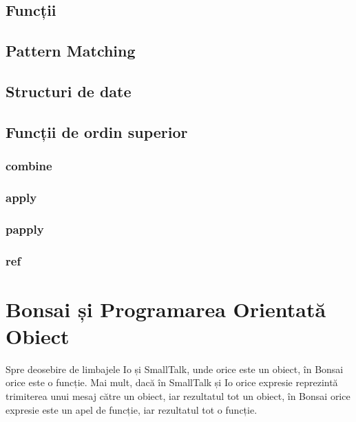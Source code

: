 \documentclass[12pt,a4paper]{memoir}
\begin{document}
\section{Funcții}

\section{Pattern Matching}

\section{Structuri de date}


\section{Funcții de ordin superior}

\subsection{combine}

\subsection{apply}

\subsection{papply}

\subsection{ref}

\chapter{Bonsai și Programarea Orientată Obiect}

Spre deosebire de limbajele Io\cite{io} și SmallTalk\cite{smalltalk}, unde orice este un obiect, în Bonsai orice este o funcție. Mai mult, dacă în SmallTalk și Io orice expresie reprezintă trimiterea unui mesaj către un obiect, iar rezultatul tot un obiect, în Bonsai orice expresie este un apel de funcție, iar rezultatul tot o funcție.
\end{document}
